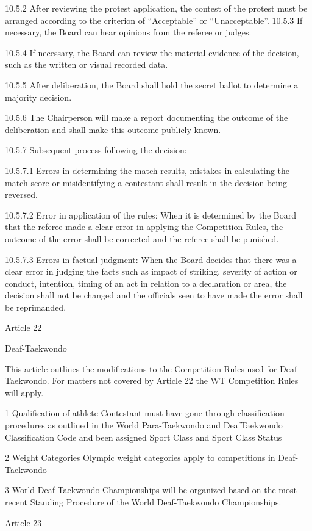 \documentclass[
]{report}
\begin{document}
10.5.2 After reviewing the protest application, the contest of the
protest must be arranged according to the criterion of ``Acceptable'' or
``Unacceptable''. 10.5.3 If necessary, the Board can hear opinions from
the referee or judges.

10.5.4 If necessary, the Board can review the material evidence of the
decision, such as the written or visual recorded data.

10.5.5 After deliberation, the Board shall hold the secret ballot to
determine a majority decision.

10.5.6 The Chairperson will make a report documenting the outcome of the
deliberation and shall make this outcome publicly known.

10.5.7 Subsequent process following the decision:

10.5.7.1 Errors in determining the match results, mistakes in
calculating the match score or misidentifying a contestant shall result
in the decision being reversed.

10.5.7.2 Error in application of the rules: When it is determined by the
Board that the referee made a clear error in applying the Competition
Rules, the outcome of the error shall be corrected and the referee shall
be punished.

10.5.7.3 Errors in factual judgment: When the Board decides that there
was a clear error in judging the facts such as impact of striking,
severity of action or conduct, intention, timing of an act in relation
to a declaration or area, the decision shall not be changed and the
officials seen to have made the error shall be reprimanded.

Article 22

Deaf-Taekwondo

This article outlines the modifications to the Competition Rules used
for Deaf-Taekwondo. For matters not covered by Article 22 the WT
Competition Rules will apply.

1 Qualification of athlete Contestant must have gone through
classification procedures as outlined in the World Para-Taekwondo and
DeafTaekwondo Classification Code and been assigned Sport Class and
Sport Class Status

2 Weight Categories Olympic weight categories apply to competitions in
Deaf-Taekwondo

3 World Deaf-Taekwondo Championships will be organized based on the most
recent Standing Procedure of the World Deaf-Taekwondo Championships.

Article 23
\end{document}
